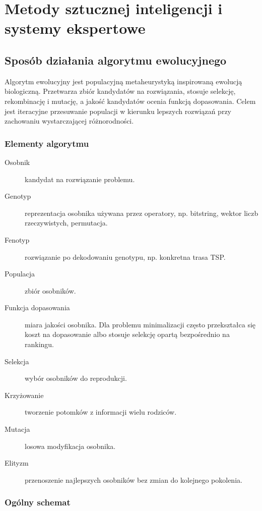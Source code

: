 \section{Metody sztucznej inteligencji i systemy ekspertowe}

\subsection{Sposób działania algorytmu ewolucyjnego}

Algorytm ewolucyjny jest populacyjną metaheurystyką inspirowaną ewolucją biologiczną. Przetwarza zbiór kandydatów na rozwiązania, stosuje selekcję, rekombinację i mutację, a jakość kandydatów ocenia funkcją dopasowania. Celem jest iteracyjne przesuwanie populacji w kierunku lepszych rozwiązań przy zachowaniu wystarczającej różnorodności.

\subsubsection{Elementy algorytmu}

\begin{description}
  \item[Osobnik] kandydat na rozwiązanie problemu.
  \item[Genotyp] reprezentacja osobnika używana przez operatory, np. bitstring, wektor liczb rzeczywistych, permutacja.
  \item[Fenotyp] rozwiązanie po dekodowaniu genotypu, np. konkretna trasa TSP.
  \item[Populacja] zbiór osobników.
  \item[Funkcja dopasowania] miara jakości osobnika. Dla problemu minimalizacji często przekształca się koszt na dopasowanie albo stosuje selekcję opartą bezpośrednio na rankingu.
  \item[Selekcja] wybór osobników do reprodukcji.
  \item[Krzyżowanie] tworzenie potomków z informacji wielu rodziców.
  \item[Mutacja] losowa modyfikacja osobnika.
  \item[Elityzm] przenoszenie najlepszych osobników bez zmian do kolejnego pokolenia.
\end{description}

\subsubsection{Ogólny schemat}

